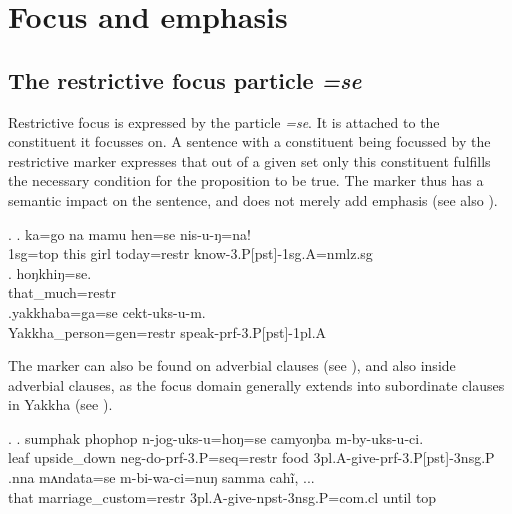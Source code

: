 \section{Focus and emphasis}\label{ptcl-foc}

\subsection{The restrictive focus particle \emph{=se}}
		
Restrictive focus is expressed by the particle \emph{=se}. It is attached to the constituent it focusses on. A sentence with a constituent being focussed by the restrictive marker  expresses that out of a given  set only this constituent fulfills the necessary condition for the proposition to be true. The  marker thus has a semantic impact on the sentence, and does not merely add emphasis (see also \citealt{Koenig1993_Focus}). 

\ex. \ag. ka=go na mamu hen=se nis-u-ŋ=na!\\
	 	{\sc 1sg=top} this girl today{\sc=restr} know{\sc -3.P[pst]-1sg.A=nmlz.sg}\\
	 	\bg.  hoŋkhiŋ=se.\\
	 	that\_much{\sc=restr}\\
		\bg.yakkhaba=ga=se       cekt-uks-u-m.\\
		Yakkha\_person{\sc =gen=restr} speak{\sc -prf-3.P[pst]-1pl.A}\\
		 
		

The   marker can also be found on adverbial clauses (see \Next[a]), and also inside adverbial clauses, as the focus domain generally extends into subordinate clauses in Yakkha (see \Next[b]).

 \ex. \ag. sumphak phophop     n-jog-uks-u=hoŋ=se                             camyoŋba m-by-uks-u-ci.\\
 leaf upside\_down {\sc neg-}do{\sc -prf-3.P=seq=restr} food {\sc 3pl.A-}give{\sc -prf-3.P[pst]-3nsg.P}\\
 \bg.nna  mʌndata=se                     m-bi-wa-ci=nuŋ                    samma cahĩ,  ...\\
 that marriage\_custom{\sc =restr} {\sc 3pl.A-}give{\sc -npst-3nsg.P=com.cl} until {\sc top}\\
   
 
